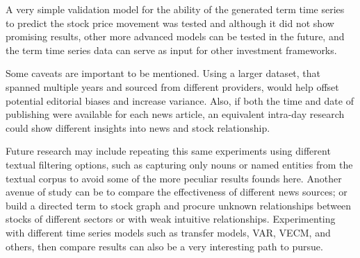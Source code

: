 \documentclass[conference,11pt]{IEEEtran}
\begin{document}
\par
A very simple validation model for the ability of the generated term time series to predict the stock price movement was tested and although it did not show promising results, other more advanced models can be tested in the future, and the term time series data can serve as input for other investment frameworks.

\par
Some caveats are important to be mentioned. Using a larger dataset, that spanned multiple years and sourced from different providers, would help offset potential editorial biases and increase variance. Also, if both the time and date of publishing were available for each news article, an equivalent intra-day research could show different insights into news and stock relationship.

\par
Future research may include repeating this same experiments using different textual filtering options, such as capturing only nouns or named entities from the textual corpus to avoid some of the more peculiar results founds here. Another avenue of study can be to compare the effectiveness of different news sources; or build a directed term to stock graph and procure unknown relationships between stocks of different sectors or with weak intuitive relationships. Experimenting with different time series models such as transfer models, VAR, VECM, and others, then compare results can also be a very interesting path to pursue.


\end{document}
